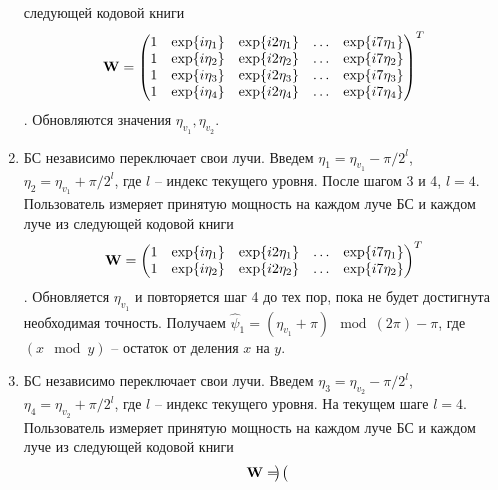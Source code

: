 \begin{enumerate}[label=\textbf{Шаг \arabic*:}]
          следующей кодовой книги
          \begin{equation}
              \vec W =
              \begin{pmatrix}
                  \mqty{
                  1 & \exp{i\eta_1} & \exp{i2\eta_1} & \dots & \exp{i7\eta_1} \\
                  1 & \exp{i\eta_2} & \exp{i2\eta_2} & \dots & \exp{i7\eta_2} \\
                  1 & \exp{i\eta_3} & \exp{i2\eta_3} & \dots & \exp{i7\eta_3} \\
                  1 & \exp{i\eta_4} & \exp{i2\eta_4} & \dots & \exp{i7\eta_4} \\
                  }
              \end{pmatrix}^T
          \end{equation}.
          Обновляются значения $\eta_{v_1}, \eta_{v_2}$.
    \item БС независимо переключает свои лучи. Введем $\eta_1 = \eta_{v_1}-\pi/2^l$,
          $\eta_2 = \eta_{v_1} + \pi/2^l$, где $l$ -- индекс текущего уровня. После шагом 3 и 4, $l=4$.
          Пользователь измеряет принятую мощность на каждом луче БС и каждом луче из
          следующей кодовой книги
          \begin{equation}
              \vec W =
              \begin{pmatrix}
                  \mqty{
                  1 & \exp{i\eta_1} & \exp{i2\eta_1} & \dots & \exp{i7\eta_1} \\
                  1 & \exp{i\eta_2} & \exp{i2\eta_2} & \dots & \exp{i7\eta_2} \\
                  }
              \end{pmatrix}^T
          \end{equation}.
          Обновляется $\eta_{v_1}$ и повторяется шаг 4 до тех пор, пока не будет
          достигнута необходимая точность. Получаем $\hat \psi_1 = (\eta_{v_1} + \pi)\mod(2\pi) - \pi$, где $(x \mod  y)$ -- остаток от деления $x$ на $y$.
    \item БС независимо переключает свои лучи. Введем $\eta_3 = \eta_{v_2}-\pi/2^l$,
          $\eta_4 = \eta_{v_2} + \pi/2^l$, где $l$ -- индекс текущего уровня. На текущем шаге $l=4$.
          Пользователь измеряет принятую мощность на каждом луче БС и каждом луче из
          следующей кодовой книги
          \begin{equation}
              \vec W =
              \begin{pmatrix}
                  \mqty{
}
\end{pmatrix}
\end{equation}
\end{enumerate}
